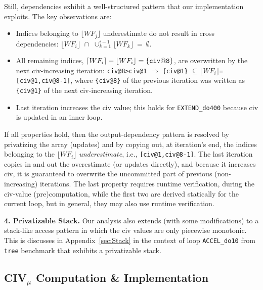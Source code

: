 \documentclass{sig-alternate}
\begin{document}
Still, dependencies exhibit a well-structured pattern that our 
implementation exploits. The key observations are: 
\begin{itemize}
    \item Indices belonging to $\lfloor{}WF_{j}\rfloor$ underestimate  
            do not result in cross dependencies:
        $\lfloor WF_{i}\rfloor\mbox{~}\cap\mbox{~}\cup_{k=1}^{i-1}\lfloor WF_{k}\rfloor~=~\emptyset$.

    \item All remaining indices, 
        $\lceil WF_{i}\rceil - \lfloor WF_{i}\rfloor = {\tt\{civ@8\}}$,
        are overwritten by the next {\sc civ}-increasing iteration:
        {\tt{}civ@8>civ@1} $\Rightarrow$
        {\tt\{civ@1\}} $\subseteq\lfloor WF_{i}\rfloor${\tt=[civ@1,civ@8-1]},
        where {\tt\{civ@8\}} of the previous iteration was written as 
        {\tt\{civ@1\}} of the next {\sc civ}-increasing iteration.

    \item Last iteration increases the {\sc civ} value; this 
        holds for {\tt EXTEND\_do400} because {\sc civ} is 
        updated in an inner loop.
\end{itemize}

If all properties hold, then the output-dependency pattern is resolved 
by privatizing the array (updates) and by copying out, at 
iteration's end, the indices belonging to the $\lfloor WF_i\rfloor$ 
{\em underestimate}, i.e., {\tt[civ@1,civ@8-1]}.
The last iteration copies in and out the overestimate (or updates directly),
and because it increases {\sc civ}, it is guaranteed to overwrite the 
uncommitted part of previous (non-increasing) iterations.
%
The last property requires runtime verification, during the {\sc civ}-value
(pre)computation, while the first two are derived statically for the current 
loop, but in general, they may also use runtime verification.

\vspace{1ex}
{\bf 4. Privatizable Stack.} Our analysis also extends (with
some modifications) to a stack-like access pattern in which
the {\sc civ} values are only piecewise monotonic.
This is discusses in Appendix~\ref{sec:Stack} in the
context of loop {\tt ACCEL\_do10} from {\tt tree} benchmark
that exhibits a privatizable stack. 


\subsection{CIV$_\mu$ Computation \& Implementation }
\label{subsect:CivImplem}
\end{document}
